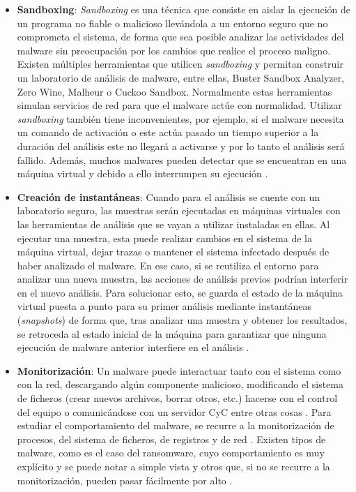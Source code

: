 \begin{itemize}
    \item \textbf{Sandboxing}: \textit{Sandboxing} es una técnica que consiste en aislar la ejecución de un programa no fiable o malicioso llevándola a un entorno seguro que no comprometa el sistema, de forma que sea posible analizar las actividades del malware sin preocupación por los cambios que realice el proceso maligno. Existen múltiples herramientas que utilicen \textit{sandboxing} y permitan construir un laboratorio de análisis de malware, entre ellas, Buster Sandbox Analyzer, Zero Wine, Malheur o Cuckoo Sandbox. Normalmente estas herramientas simulan servicios de red para que el malware actúe con normalidad. Utilizar \textit{sandboxing} también tiene inconvenientes, por ejemplo, si el malware necesita un comando de activación o este actúa pasado un tiempo superior a la duración del análisis este no llegará a activarse y por lo tanto el análisis será fallido. Además, muchos malwares pueden detectar que se encuentran en una máquina virtual y debido a ello interrumpen su ejecución \cite{PMA2012}.
    \item \textbf{Creación de instantáneas}: Cuando para el análisis se cuente con un laboratorio seguro, las muestras serán ejecutadas en máquinas virtuales con las herramientas de análisis que se vayan a utilizar instaladas en ellas. Al ejecutar una muestra, esta puede realizar cambios en el sistema de la máquina virtual, dejar trazas o mantener el sistema infectado después de haber analizado el malware. En ese caso, si se reutiliza el entorno para analizar una nueva muestra, las acciones de análisis previos podrían interferir en el nuevo análisis. Para solucionar esto, se guarda el estado de la máquina virtual puesta a punto para su primer análisis mediante instantáneas (\textit{snapshots}) de forma que, tras analizar una muestra y obtener los resultados, se retroceda al estado inicial de la máquina para garantizar que ninguna ejecución de malware anterior interfiere en el análisis \cite{Mohanta2020}.
    \item \textbf{Monitorización}: Un malware puede interactuar tanto con el sistema como con la red, descargando algún componente malicioso, modificando el sistema de ficheros (crear nuevos archivos, borrar otros, etc.)  hacerse con el control del equipo  o comunicándose con un servidor \gls{CyC} entre otras cosas \cite{123}. Para estudiar el comportamiento del malware, se recurre a la monitorización de procesos, del sistema de ficheros, de registros y de red \cite{LMA2018}. Existen tipos de malware, como es el caso del ransomware, cuyo comportamiento es muy explícito y se puede notar a simple vista y otros que, si no se recurre a la monitorización, pueden pasar fácilmente por alto \cite{Mohanta2020}. 

\end{itemize}
